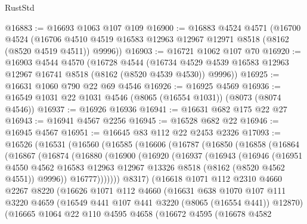 \begin{lexlean}{RustStd}
\begin{coremodule}
@16883 := @16693 @1063 @107 @109
@16900 := @16883
    @4524
    @4571
    (@16700
      @4524
      (@16706 @4510 @4519 @16583 @12963 @12967 @12971 @8518 (@8162 (@8520 @4519 @4511)) @9996))
@16903 := @16721 @1062 @107 @70
@16920 := @16903
    @4544
    @4570
    (@16728
      @4544
      (@16734 @4529 @4539 @16583 @12963 @12967 @16741 @8518 (@8162 (@8520 @4539 @4530)) @9996))
@16925 := @16631 @1060 @790 @22 @69 @4546
@16926 := @16925 @4569
@16936 := @16549 @1031 @22 @1031 @4546 (@8065 (@16554 @1031)) (@8073 (@8074 @4546))
@16937 := @16926 @16936
@16941 := @16631 @682 @175 @22 @27
@16943 := @16941 @4567 @2256
@16945 := @16528 @682 @22
@16946 := @16945 @4567
@16951 := @16645 @83 @112 @22 @2453 @2326
@17093 := @16526
    (@16531
      (@16560
        (@16585
          (@16606
            (@16787
              (@16850
                (@16858
                  (@16864
                    (@16867
                      (@16874
                        (@16880
                          (@16900
                            (@16920
                              (@16937
                                (@16943
                                  (@16946
                                    (@16951
                                      @4550
                                      @4562
                                      @16583
                                      @12963
                                      @12967
                                      @13326
                                      @8518
                                      (@8162 (@8520 @4562 @4551))
                                      @9996))
                                  @16777)))))))
                    @8317)
                  (@16618
                    @1071
                    @112
                    @2310
                    @4660
                    @2267
                    @8220
                    (@16626
                      @1071
                      @112
                      @4660
                      (@16631
                        @638
                        @1070
                        @107
                        @111
                        @3220
                        @4659
                        (@16549 @441 @107 @441 @3220 (@8065 (@16554 @441)) @12870)
                        (@16665
                          @1064
                          @22
                          @110
                          @4595
                          @4658
                          (@16672
                            @4595
                            (@16678
                              @4582

\end{coremodule}
\end{lexlean}
